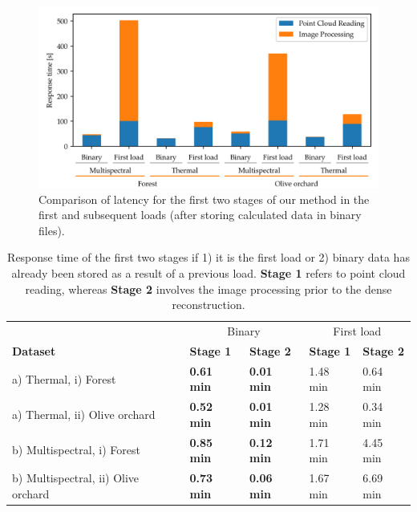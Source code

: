 \begin{figure}[ht]
    \centering
    \includegraphics[width=.85\linewidth]{figs/multi_thermal_projection/results/binary_response_time.png}
    \caption{Comparison of latency for the first two stages of our method in the first and subsequent loads (after storing calculated data in binary files).}
	\label{fig:occlusion_binary_response_time}
\end{figure}

\renewcommand{\arraystretch}{1.2}
\begin{table}
    \sffamily\footnotesize
    \centering
    \caption{Response time of the first two stages if 1) it is the first load or 2) binary data has already been stored as a result of a previous load. \textbf{Stage 1} refers to point cloud reading, whereas \textbf{Stage 2} involves the image processing prior to the dense reconstruction. }
    \label{table:binary_results}
    \begin{tabular}{l|ll|ll}
    \toprule
    & \multicolumn{2}{c}{Binary} & \multicolumn{2}{c}{First load}\\
    \cmidrule{1-5}
    \textbf{Dataset} & \textbf{Stage 1} & \textbf{Stage 2} & \textbf{Stage 1} & \textbf{Stage 2}\\
    \cmidrule{1-5}
    a) Thermal, i) Forest & \textbf{0.61 \si{\minute}} & \textbf{0.01 \si{\minute}} & 1.48 \si{\minute} & 0.64 \si{\minute}\\
    \cmidrule{1-5}
    a) Thermal, ii) Olive orchard & \textbf{0.52 \si{\minute}} & \textbf{0.01 \si{\minute}} & 1.28 \si{\minute} & 0.34 \si{\minute}\\
    \cmidrule{1-5}
    b) Multispectral, i) Forest & \textbf{0.85 \si{\minute}} & \textbf{0.12 \si{\minute}} & 1.71 \si{\minute} & 4.45 \si{\minute}\\
    \cmidrule{1-5}
    b) Multispectral, ii) Olive orchard & \textbf{0.73 \si{\minute}} & \textbf{0.06 \si{\minute}} & 1.67 \si{\minute} & 6.69 \si{\minute}\\
    \bottomrule
    \end{tabular}
\end{table}
\renewcommand{\arraystretch}{1}

